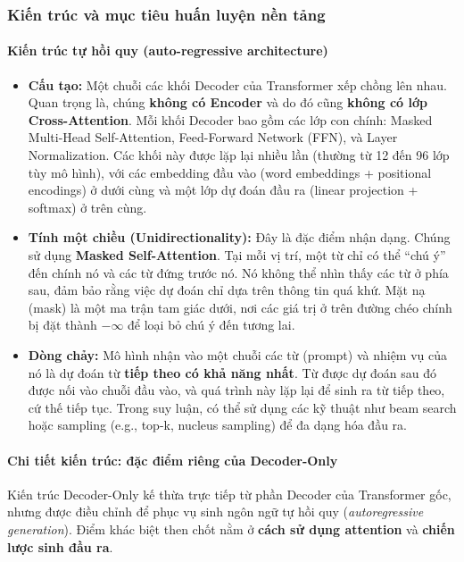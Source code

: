 \subsubsection{Kiến trúc và mục tiêu huấn luyện nền tảng}
\paragraph{Kiến trúc tự hồi quy (auto-regressive architecture)}
\begin{itemize}
	\item \textbf{Cấu tạo:} Một chuỗi các khối Decoder của Transformer xếp chồng lên nhau. Quan trọng là, chúng \textbf{không có Encoder} và do đó cũng \textbf{không có lớp Cross-Attention}. Mỗi khối Decoder bao gồm các lớp con chính: Masked Multi-Head Self-Attention, Feed-Forward Network (FFN), và Layer Normalization. Các khối này được lặp lại nhiều lần (thường từ 12 đến 96 lớp tùy mô hình), với các embedding đầu vào (word embeddings + positional encodings) ở dưới cùng và một lớp dự đoán đầu ra (linear projection + softmax) ở trên cùng.
	\item \textbf{Tính một chiều (Unidirectionality):} Đây là đặc điểm nhận dạng. Chúng sử dụng \textbf{Masked Self-Attention}. Tại mỗi vị trí, một từ chỉ có thể “chú ý” đến chính nó và các từ đứng trước nó. Nó không thể nhìn thấy các từ ở phía sau, đảm bảo rằng việc dự đoán chỉ dựa trên thông tin quá khứ. Mặt nạ (mask) là một ma trận tam giác dưới, nơi các giá trị ở trên đường chéo chính bị đặt thành $-\infty$ để loại bỏ chú ý đến tương lai.
	\item \textbf{Dòng chảy:} Mô hình nhận vào một chuỗi các từ (prompt) và nhiệm vụ của nó là dự đoán từ \textbf{tiếp theo có khả năng nhất}. Từ được dự đoán sau đó được nối vào chuỗi đầu vào, và quá trình này lặp lại để sinh ra từ tiếp theo, cứ thế tiếp tục. Trong suy luận, có thể sử dụng các kỹ thuật như beam search hoặc sampling (e.g., top-k, nucleus sampling) để đa dạng hóa đầu ra.
\end{itemize}

\paragraph{Chi tiết kiến trúc: đặc điểm riêng của Decoder-Only}
Kiến trúc Decoder-Only kế thừa trực tiếp từ phần Decoder của Transformer gốc, 
nhưng được điều chỉnh để phục vụ sinh ngôn ngữ tự hồi quy (\textit{autoregressive generation}). 
Điểm khác biệt then chốt nằm ở \textbf{cách sử dụng attention} và \textbf{chiến lược sinh đầu ra}.

